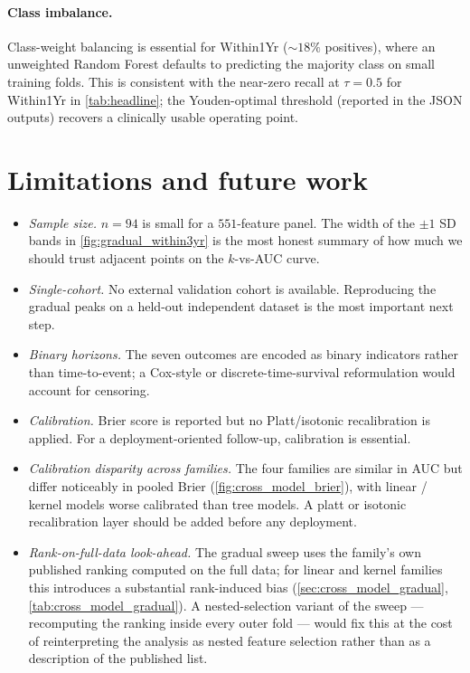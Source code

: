 \documentclass[11pt,a4paper]{article}
\providecommand{\Cref}[1]{\autoref{#1}}
\begin{document}
\paragraph{Class imbalance.}
Class-weight balancing is essential for Within1Yr ($\sim18\%$
positives), where an unweighted Random Forest defaults to predicting
the majority class on small training folds. This is consistent with the
near-zero recall at $\tau=0.5$ for Within1Yr in \Cref{tab:headline}; the
Youden-optimal threshold (reported in the JSON outputs) recovers a
clinically usable operating point.

\section{Limitations and future work}
\label{sec:limitations}

\begin{itemize}[leftmargin=*]
  \item \emph{Sample size.} $n=94$ is small for a $551$-feature panel.
    The width of the $\pm 1$ SD bands in \Cref{fig:gradual_within3yr}
    is the most honest summary of how much we should trust adjacent
    points on the $k$-vs-AUC curve.
  \item \emph{Single-cohort.} No external validation cohort is available.
    Reproducing the gradual peaks on a held-out independent dataset is
    the most important next step.
  \item \emph{Binary horizons.} The seven outcomes are encoded as
    binary indicators rather than time-to-event; a Cox-style or
    discrete-time-survival reformulation would account for censoring.
  \item \emph{Calibration.} Brier score is reported but no
    Platt/isotonic recalibration is applied. For a deployment-oriented
    follow-up, calibration is essential.
  \item \emph{Calibration disparity across families.} The four families
    are similar in AUC but differ noticeably in pooled Brier
    (\Cref{fig:cross_model_brier}), with linear / kernel models worse
    calibrated than tree models. A platt or isotonic recalibration
    layer should be added before any deployment.
  \item \emph{Rank-on-full-data look-ahead.} The gradual sweep uses the
    family's own published ranking computed on the full data; for
    linear and kernel families this introduces a substantial
    rank-induced bias (\Cref{sec:cross_model_gradual},
    \Cref{tab:cross_model_gradual}). A nested-selection variant of the
    sweep --- recomputing the ranking inside every outer fold --- would
    fix this at the cost of reinterpreting the analysis as nested
    feature selection rather than as a description of the published
    list.
\end{itemize}
\end{document}
